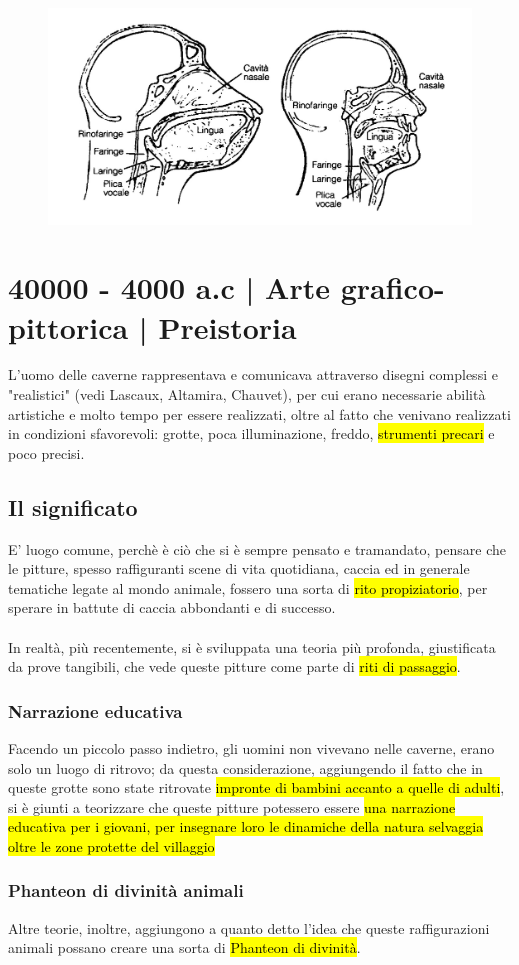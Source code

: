 \begin{figure}[h]
    \centering
    \includegraphics[width=0.4\linewidth]{blocco_3 - storia della scrittura/imgs/0016.jpg}
\end{figure}


\section{40000 - 4000 a.c | Arte grafico-pittorica | Preistoria}
L'uomo delle caverne rappresentava e comunicava attraverso disegni complessi e "realistici" (vedi Lascaux, Altamira, Chauvet), per cui erano necessarie abilità artistiche e molto tempo per essere realizzati, oltre al fatto che venivano realizzati in condizioni sfavorevoli: grotte, poca illuminazione, freddo, \hl{strumenti precari} e poco precisi.
    \subsection{Il significato}
    E' luogo comune, perchè è ciò che si è sempre pensato e tramandato, pensare che le pitture, spesso raffiguranti scene di vita quotidiana, caccia ed in generale tematiche legate al mondo animale, fossero una sorta di \hl{rito propiziatorio}, per sperare in battute di caccia abbondanti e di successo.
    \\\\In realtà, più recentemente, si è sviluppata una teoria più profonda, giustificata da prove tangibili, che vede queste pitture come parte di \hl{riti di passaggio}.
    \subsubsection{Narrazione educativa}
    Facendo un piccolo passo indietro, gli uomini non vivevano nelle caverne, erano solo un luogo di ritrovo; da questa considerazione, aggiungendo il fatto che in queste grotte sono state ritrovate \hl{impronte di bambini accanto a quelle di adulti}, si è giunti a teorizzare che queste pitture potessero essere \hl{una narrazione educativa per i giovani, per insegnare loro le dinamiche della natura selvaggia oltre le zone protette del villaggio }
    \subsubsection{Phanteon di divinità animali}
    Altre teorie, inoltre, aggiungono a quanto detto l'idea che queste raffigurazioni animali possano creare una sorta di \hl{Phanteon di divinità}.

